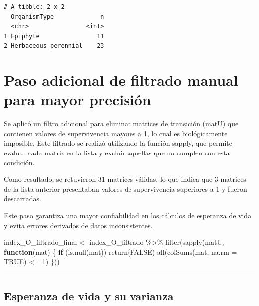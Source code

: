 \documentclass[
  12pt,
  letterpaper,
]{book}
\newenvironment{Shaded}{\begin{snugshade}}{\end{snugshade}}
\newcommand{\AttributeTok}[1]{\textcolor[rgb]{0.40,0.45,0.13}{#1}}
\newcommand{\ConstantTok}[1]{\textcolor[rgb]{0.56,0.35,0.01}{#1}}
\newcommand{\ControlFlowTok}[1]{\textcolor[rgb]{0.00,0.23,0.31}{\textbf{#1}}}
\newcommand{\DecValTok}[1]{\textcolor[rgb]{0.68,0.00,0.00}{#1}}
\newcommand{\FunctionTok}[1]{\textcolor[rgb]{0.28,0.35,0.67}{#1}}
\newcommand{\NormalTok}[1]{\textcolor[rgb]{0.00,0.23,0.31}{#1}}
\newcommand{\OtherTok}[1]{\textcolor[rgb]{0.00,0.23,0.31}{#1}}
\newcommand{\SpecialCharTok}[1]{\textcolor[rgb]{0.37,0.37,0.37}{#1}}
\begin{document}
\begin{verbatim}
# A tibble: 2 x 2
  OrganismType             n
  <chr>                <int>
1 Epiphyte                11
2 Herbaceous perennial    23
\end{verbatim}

\chapter{Paso adicional de filtrado manual para mayor
precisión}\label{paso-adicional-de-filtrado-manual-para-mayor-precisiuxf3n-1}

Se aplicó un filtro adicional para eliminar matrices de transición
(matU) que contienen valores de supervivencia mayores a 1, lo cual es
biológicamente imposible. Este filtrado se realizó utilizando la función
sapply, que permite evaluar cada matriz en la lista y excluir aquellas
que no cumplen con esta condición.

Como resultado, se retuvieron 31 matrices válidas, lo que indica que 3
matrices de la lista anterior presentaban valores de supervivencia
superiores a 1 y fueron descartadas.

Este paso garantiza una mayor confiabilidad en los cálculos de esperanza
de vida y evita errores derivados de datos inconsistentes.

\begin{Shaded}
\begin{Highlighting}[]
\NormalTok{index\_O\_filtrado\_final }\OtherTok{\textless{}{-}}\NormalTok{ index\_O\_filtrado }\SpecialCharTok{\%\textgreater{}\%}
  \FunctionTok{filter}\NormalTok{(}\FunctionTok{sapply}\NormalTok{(matU, }\ControlFlowTok{function}\NormalTok{(mat) \{}
    \ControlFlowTok{if}\NormalTok{ (}\FunctionTok{is.null}\NormalTok{(mat)) }\FunctionTok{return}\NormalTok{(}\ConstantTok{FALSE}\NormalTok{)}
    \FunctionTok{all}\NormalTok{(}\FunctionTok{colSums}\NormalTok{(mat, }\AttributeTok{na.rm =} \ConstantTok{TRUE}\NormalTok{) }\SpecialCharTok{\textless{}=} \DecValTok{1}\NormalTok{)}
\NormalTok{  \}))}
\end{Highlighting}
\end{Shaded}

\begin{center}\rule{0.5\linewidth}{0.5pt}\end{center}

\section{Esperanza de vida y su
varianza}\label{esperanza-de-vida-y-su-varianza-1}
\end{document}
